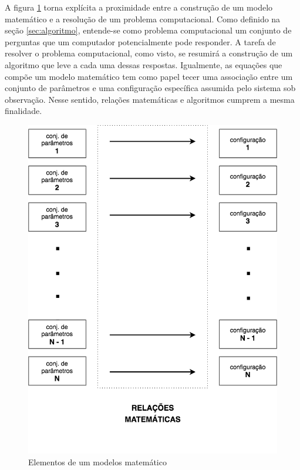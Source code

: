 A figura \ref{fig:modelo_matematico} torna explícita a proximidade entre a construção de um modelo matemático e a resolução de um problema computacional. Como definido na seção \ref{sec:algoritmo}, entende-se como problema computacional um conjunto de perguntas que um computador potencialmente pode responder. A tarefa de resolver o problema computacional, como visto, se resumirá a construção de um algoritmo que leve a cada uma dessas respostas. Igualmente, as equações que compõe um modelo matemático tem como papel tecer uma associação entre um conjunto de parâmetros e uma configuração específica assumida pelo sistema sob observação. Nesse sentido, relações matemáticas e algoritmos cumprem a mesma finalidade.

\begin{figure}[!htb]
	\caption{Elementos de um modelos matemático}\label{fig:modelo_matematico}
	\begin{center}
		\includegraphics[scale=0.50]{imagens/modelo_matematico}
	\end{center}
\end{figure}


